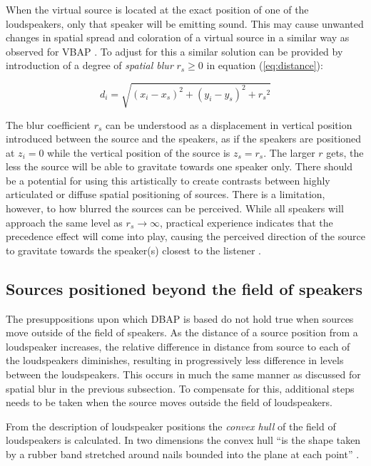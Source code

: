 \documentclass[twoside,10pt]{article}
\begin{document}
When the virtual source is located at the exact position of one of the loudspeakers, only that speaker will be emitting sound. This may cause unwanted changes in spatial spread and coloration of a virtual source in a similar way as observed for VBAP \cite{Pulkki:1999vbap}. To adjust for this a similar solution can be provided by introduction of a degree of \textit{spatial blur} $r_{s} \ge 0$ in equation (\ref{eq:distance}):

\begin{equation} \label{eq:mod_distance}
d_{i} = \sqrt{ {(x_{i} - x_{s})}^2 + {(y_{i} - y_{s})}^2 + {r_{s}}^2}
\end{equation}

The blur coefficient $r_{s}$ can be understood as a displacement in vertical position introduced between the source and the speakers, as if the speakers are positioned at $z_{i}=0$ while the vertical position of the source is $z_{s}=r_{s}$. The larger $r$ gets, the less the source will be able to gravitate towards one speaker only. There should be a potential for using this artistically to create contrasts between highly articulated or diffuse spatial positioning of sources.  There is a limitation, however, to how blurred the sources can be perceived.  While all speakers will approach the same level as $ r_{s} \rightarrow \infty $, practical experience indicates that the precedence effect will come into play, causing the perceived direction of the source to gravitate towards the speaker(s) closest to the listener \cite{Litovsky:1999precedence_effect}.




\subsection{Sources positioned beyond the field of speakers}

The presuppositions upon which DBAP is based do not hold true when sources move outside of the field of speakers. As the distance of a source position from a loudspeaker increases, the relative difference in distance from source to each of the loudspeakers diminishes, resulting in progressively less difference in levels between the loudspeakers.  This occurs in much the same manner as discussed for spatial blur in the previous subsection. To compensate for this, additional steps needs to be taken when the source moves outside the field of loudspeakers.

From the description of loudspeaker positions the \emph{convex hull} of the field of loudspeakers is calculated. In two dimensions the convex hull ``is the shape taken by a rubber band stretched around nails bounded into the plane at each point'' \cite{Rourke:1998_geometry}.
\end{document}

